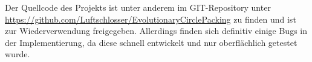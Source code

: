 \documentclass[twoside,bibtotoc]{report}
\begin{document}
Der Quellcode des Projekts ist unter anderem im GIT-Repository unter \url{https://github.com/Luftschlosser/EvolutionaryCirclePacking} zu finden und ist zur Wiederverwendung freigegeben.
Allerdings finden sich definitiv einige Bugs in der Implementierung, da diese schnell entwickelt und nur oberflächlich getestet wurde.

\nsecend%





\nsecdocumentend

\printglossary[title=Glossar] %
\printglossary[type=\acronymtype,title=Abkürzungsverzeichnis]
\printbibliography
\end{document}
